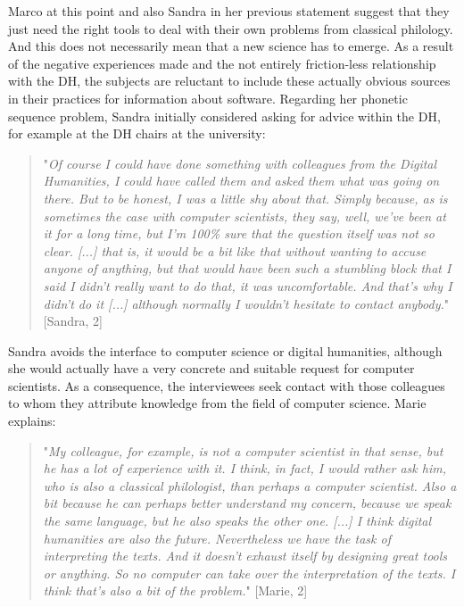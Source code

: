 \documentclass[12pt, a4paper, titlepage, oneside, abstract=true, toc=listof, toc=bibliography, BCOR=1cm]{scrreprt}
\begin{document}
{Marco at this point and also Sandra in her previous statement suggest that they just need the right tools to deal with their own problems from classical philology. And this does not necessarily mean that a new science has to emerge. As a result of the negative experiences made and the not entirely friction-less relationship with the DH, the subjects are reluctant to include these actually obvious sources in their practices for information about software. Regarding her phonetic sequence problem, Sandra initially considered asking for advice within the DH, for example at the DH chairs at the university:

\begin{quotation}
"\textit{Of course I could have done something with colleagues from the Digital Humanities, I could have called them and asked them what was going on there. But to be honest, I was a little shy about that. Simply because, as is sometimes the case with computer scientists, they say, well, we've been at it for a long time, but I'm 100\% sure that the question itself was not so clear. [...] that is, it would be a bit like that without wanting to accuse anyone of anything, but that would have been such a stumbling block that I said I didn't really want to do that, it was uncomfortable. And that's why I didn't do it [...] although normally I wouldn't hesitate to contact anybody.}" [Sandra, 2]
\end{quotation}

Sandra avoids the interface to computer science or digital humanities, although she would actually have a very concrete and suitable request for computer scientists. As a consequence, the interviewees seek contact with those colleagues to whom they attribute knowledge from the field of computer science. Marie explains:

\begin{quotation}
"\textit{My colleague, for example, is not a computer scientist in that sense, but he has a lot of experience with it. I think, in fact, I would rather ask him, who is also a classical philologist, than perhaps a computer scientist. Also a bit because he can perhaps better understand my concern, because we speak the same language, but he also speaks the other one. [...] I think digital humanities are also the future. Nevertheless we have the task of interpreting the texts. And it doesn't exhaust itself by designing great tools or anything. So no computer can take over the interpretation of the texts. I think that's also a bit of the problem.}" [Marie, 2]
\end{quotation}

}
\end{document}
